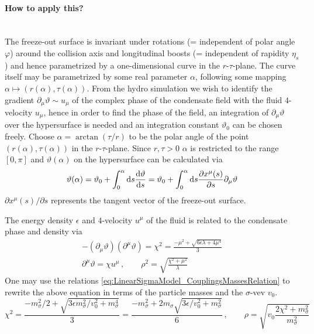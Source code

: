 % 

\paragraph*{How to apply this?}\mbox{}\\

The freeze-out surface is invariant under rotations (= independent of polar angle $\varphi$) around the collision axis and longitudinal boosts (= independent of rapidity $\eta_s$) and hence parametrized by a one-dimensional curve in the $r\text{-}\tau$-plane. The curve itself may be parametrized by some real parameter $\alpha$, following some mapping $\alpha\mapsto (r(\alpha),\tau(\alpha))$. From the hydro simulation we wish to identify the gradient $\partial_\mu\vartheta\sim u_\mu$ of the complex phase of the condensate field with the fluid $4$-velocity $u_\mu$, hence in order to find the phase of the field, an integration of $\partial_\mu\vartheta$ over the hypersurface is needed and an integration constant $\vartheta_0$ can be chosen freely. Choose $\alpha=\arctan(\tau/r)$ to be the polar angle of the point $(r(\alpha),\tau(\alpha))$ in the $r\text{-}\tau$-plane. Since $r,\tau>0$ $\alpha$ is restricted to the range $[0,\pi]$ and $\vartheta(\alpha)$ on the hypersurface can be calculated via
\begin{equation}
    \vartheta(\alpha)=\vartheta_0+\int_0^\alpha\text{d} s\frac{\text{d}\vartheta}{\text{d} s}=\vartheta_0+\int_0^\alpha\text{d} s\frac{\partial x^\mu(s)}{\partial s}\partial_\mu\vartheta
\end{equation}
$\partial x^\mu(s)/\partial s$ represents the tangent vector of the freeze-out surface.

The energy density $\epsilon$ and $4$-velocity $u^\mu$ of the fluid is related to the condensate phase and density via
\begin{subequations}
    \begin{gather}
        -(\partial_\mu\vartheta)(\partial^\mu\vartheta)=\chi^2=\frac{-\mu^2+\sqrt{6\epsilon\lambda+4\mu^4}}{3}\\
        \partial^\mu\vartheta=\chi u^\mu\,,\qquad\rho^2=\sqrt{\frac{\chi^2+\mu^2}{\lambda}}
    \end{gather}
\end{subequations}
One may use the relations \eqref{eq:LinearSigmaModel_CouplingsMassesRelation} to rewrite the above equation in terms of the particle masses and the $\sigma$-vev $v_0$.
\begin{equation}
    \chi^2=\frac{-m_\sigma^2/2+\sqrt{3\epsilon m_\sigma^2/v_0^2+m_\sigma^4}}{3}=\frac{-m_\sigma^2+2m_\sigma\sqrt{3\epsilon/v_0^2+m_\sigma^2}}{6}\,,\qquad\rho=\sqrt{v_0\frac{2\chi^2+m_\sigma^2}{m_\sigma^2}}
\end{equation}

